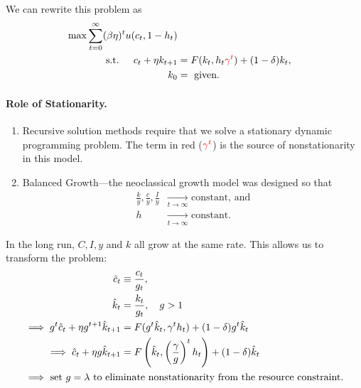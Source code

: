 \documentclass[11pt]{article}
\newcommand{\rd}{\textcolor{red}}
\begin{document}
We can rewrite this problem as
\begin{align*}
\max \sum^\infty_{t = 0} (\beta \eta)^t u(c_t, 1 - h_t)\\
\text{s.t. }\quad c_t + \eta k_{t + 1} &= F(k_t, h_t \rd{\gamma^t}) + (1 - \delta) k_t,\\
k_0 &= \text{ given.}
\end{align*}

\paragraph{Role of Stationarity.}
\begin{enumerate}
\item Recursive solution methods require that we solve a stationary dynamic programming problem. The term in red ($\rd{\gamma^t}$) is the source of nonstationarity in this model.
\item Balanced Growth---the neoclassical growth model was designed so that
\begin{align*}
\frac{k}{y}, \frac{c}{y}, \frac{I}{y} &\underset{t \to \infty}{\to} \text{ constant, and}\\
h &\underset{t \to \infty}{\to} \text{ constant.}
\end{align*}
\end{enumerate}

In the long run, \(C, I, y\) and \(k\) all grow at the same rate. This allows us to transform the problem:
\begin{align*}
\hat{c}_t &\equiv \frac{c_t}{g_t},\\
\hat{k}_t &= \frac{k_t}{g_t}, \quad g > 1\\
\implies g^t \hat{c}_t + \eta g^{t + 1}\hat{k}_{t + 1} &= F(g^t \hat{k}_t, \gamma^t h_t) + (1 - \delta) g^t \hat{k}_t\\
\implies \hat{c}_t + \eta g \hat{k}_{t + 1} &= F \left(\hat{k}_t, \left(\frac{\gamma}{g}\right)^t h_t\right) + (1 - \delta) \hat{k}_t\\
\intertext{$\implies$ set $g = \lambda$ to eliminate nonstationarity from the resource constraint.}
\end{align*}
\end{document}
